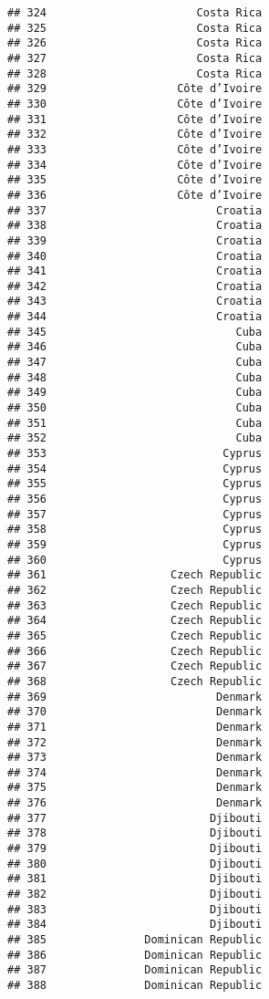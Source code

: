 \documentclass[]{article}
\begin{document}
\begin{verbatim}
## 324                       Costa Rica
## 325                       Costa Rica
## 326                       Costa Rica
## 327                       Costa Rica
## 328                       Costa Rica
## 329                    Côte d’Ivoire
## 330                    Côte d’Ivoire
## 331                    Côte d’Ivoire
## 332                    Côte d’Ivoire
## 333                    Côte d’Ivoire
## 334                    Côte d’Ivoire
## 335                    Côte d’Ivoire
## 336                    Côte d’Ivoire
## 337                          Croatia
## 338                          Croatia
## 339                          Croatia
## 340                          Croatia
## 341                          Croatia
## 342                          Croatia
## 343                          Croatia
## 344                          Croatia
## 345                             Cuba
## 346                             Cuba
## 347                             Cuba
## 348                             Cuba
## 349                             Cuba
## 350                             Cuba
## 351                             Cuba
## 352                             Cuba
## 353                           Cyprus
## 354                           Cyprus
## 355                           Cyprus
## 356                           Cyprus
## 357                           Cyprus
## 358                           Cyprus
## 359                           Cyprus
## 360                           Cyprus
## 361                   Czech Republic
## 362                   Czech Republic
## 363                   Czech Republic
## 364                   Czech Republic
## 365                   Czech Republic
## 366                   Czech Republic
## 367                   Czech Republic
## 368                   Czech Republic
## 369                          Denmark
## 370                          Denmark
## 371                          Denmark
## 372                          Denmark
## 373                          Denmark
## 374                          Denmark
## 375                          Denmark
## 376                          Denmark
## 377                         Djibouti
## 378                         Djibouti
## 379                         Djibouti
## 380                         Djibouti
## 381                         Djibouti
## 382                         Djibouti
## 383                         Djibouti
## 384                         Djibouti
## 385               Dominican Republic
## 386               Dominican Republic
## 387               Dominican Republic
## 388               Dominican Republic

\end{verbatim}
\end{document}
